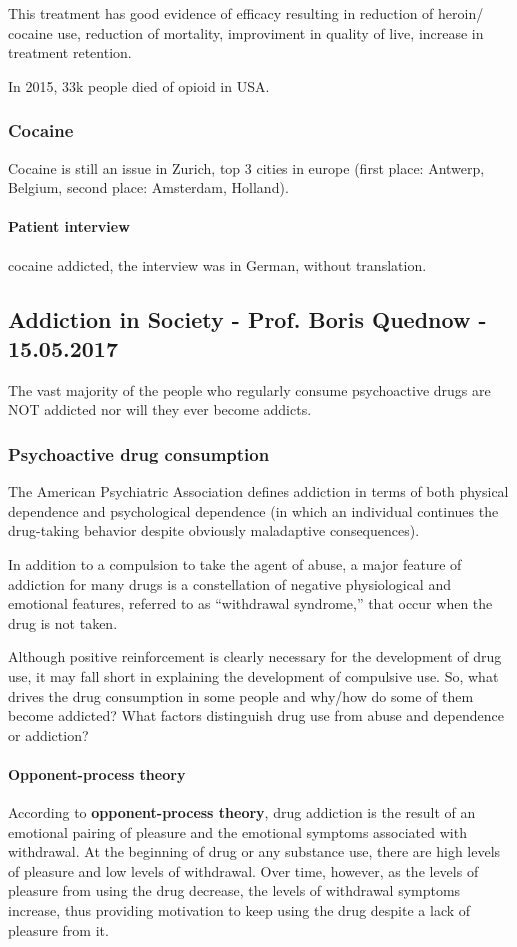 \documentclass[12pt,article,oneside,a4paper]{memoir}
\begin{document}
This treatment has good evidence of efficacy resulting in reduction of heroin/
cocaine use, reduction of mortality, improviment in quality of live, increase
in treatment retention.

In 2015, 33k people died of opioid in USA.

\subsubsection{Cocaine}
Cocaine is still an issue in Zurich, top 3 cities in europe
(first place: Antwerp, Belgium, second place: Amsterdam, Holland).

\paragraph{Patient interview}
cocaine addicted, the interview was in German, without translation.

\subsection{Addiction in Society - Prof. Boris Quednow - 15.05.2017}

The vast majority of the people who regularly consume psychoactive drugs are
NOT addicted nor will they ever become addicts.

\subsubsection{Psychoactive drug consumption}

The American Psychiatric Association defines addiction in terms of both
physical dependence and psychological dependence (in which an individual
continues the drug-taking behavior despite obviously maladaptive consequences).

In addition to a compulsion to take the agent of abuse, a major feature of
addiction for many drugs is a constellation of negative physiological and
emotional features, referred to as “withdrawal syndrome,” that occur when the
drug is not taken. 

Although positive reinforcement is clearly necessary for the development of
drug use, it may fall short in explaining the development of compulsive use.
So, what drives the drug consumption in some people and why/how do some of them
become addicted? What factors distinguish drug use from abuse and dependence or
addiction?

\paragraph{Opponent-process theory}
According to \textbf{opponent-process theory}, drug addiction is the result of
an emotional pairing of pleasure and the emotional symptoms associated with
withdrawal. At the beginning of drug or any substance use, there are high
levels of pleasure and low levels of withdrawal. Over time, however, as the
levels of pleasure from using the drug decrease, the levels of withdrawal
symptoms increase, thus providing motivation to keep using the drug despite a
lack of pleasure from it.
\end{document}
